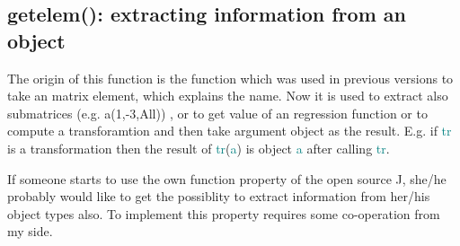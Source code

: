 \subsection{\textcolor{VioletRed}{getelem}(): extracting information from an object}
\label{getelems}
The origin of this function is the function which was used in previous versions
to take an matrix element, which explains the name. Now it is used to extract
also submatrices (e.g. a(1,-3,All)) , or to get value of an regression
function or to compute
a transforamtion and then take argument object as the result. E.g. if \textcolor{teal}{tr} is a transformation
then the result of  \textcolor{teal}{tr}(\textcolor{teal}{a}) is object \textcolor{teal}{a} after calling \textcolor{teal}{tr}.
\begin{note}
If someone starts to use the own function property of the open source J, she/he
probably would like to get the possiblity to extract information from her/his object types
also. To implement this property requires some co-operation from my side.
\end{note}
